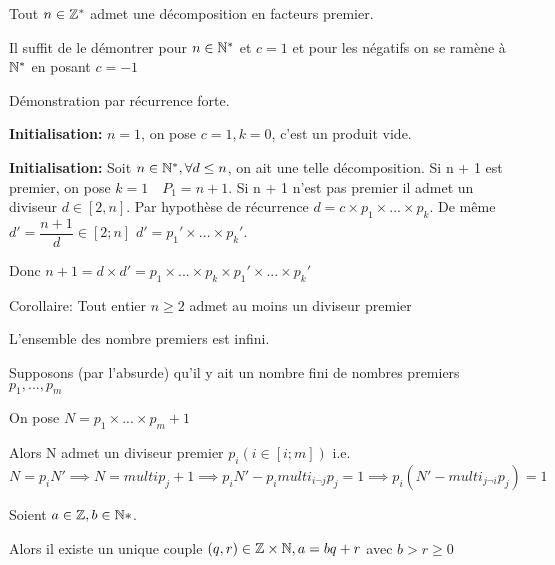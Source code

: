 \documentclass[a4paper, 12pt]{article}
\begin{document}
\begin{proposition}
    Tout $n \in \mathbb{Z}^*$ admet une décomposition en facteurs premier.
\end{proposition}

\begin{demonstration}
    Il suffit de le démontrer pour $n \in \mathbb{N}^*$ et $c = 1$ et pour les négatifs on se ramène à $\mathbb{N}^*$ en posant $c = -1$

    Démonstration par récurrence forte.

    \textbf{Initialisation:} $n = 1$, on pose $c = 1, k = 0$, c'est un produit vide.

    \textbf{Initialisation:} Soit $n \in \mathbb{N}^*, \forall d \leq n$, on ait une telle décomposition.
    Si n + 1 est premier, on pose $k = 1 \quad P_1 = n + 1$.
    Si n + 1 n'est pas premier il admet un diviseur $d \in [2, n]$.
    Par hypothèse de récurrence $d = c \times p_1 \times ... \times p_k$.
    De même $d' = \dfrac{n+1}{d} \in [2; n]$
    $d' = p_1' \times ... \times p_k'$.

    Donc $n + 1 = d \times d' = p_1 \times ... \times p_k \times p_1' \times ... \times p_k'$
\end{demonstration}

Corollaire: Tout entier $n \geq 2$ admet au moins un diviseur premier

\begin{proposition}
    L'ensemble des nombre premiers est infini.
\end{proposition}

\begin{demonstration}
    Supposons (par l'absurde) qu'il y ait un nombre fini de nombres premiers $p_1, ..., p_m$

    On pose $N = p_1 \times ... \times p_m + 1$

    Alors N admet un diviseur premier $p_i (i \in [i; m])$
    i.e. $N = p_i N' \implies N = multi p_j + 1 \implies p_i N' - p_i multi_{i \neg j} p_j = 1 \implies p_i (N' - multi_{j \neg i} p_j) = 1$
\end{demonstration}

\begin{theorem}
    Soient $a \in \mathbb{Z}, b \in \mathbb{N}*$.
    
    Alors il existe un unique couple $(q, r) \in \mathbb{Z} \times \mathbb{N}, a = bq + r$ avec $b \gt r \geq 0$
\end{theorem}
\end{document}
